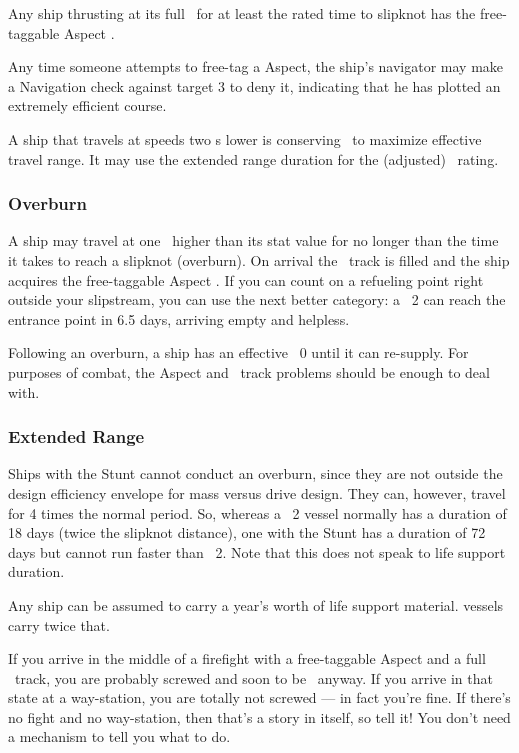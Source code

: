 Any ship thrusting at its full \Vshift\ for at least the rated time to slipknot has the free-taggable Aspect .

Any time someone attempts to free-tag a  Aspect, the ship's navigator may make a Navigation check against target 3 to deny it, indicating that he has plotted an extremely efficient course.

A ship that travels at speeds two \Vshift{}s lower is conserving \RMass\ to maximize effective travel range. It may use the extended range duration for the (adjusted) \Vshift\ rating.



\subsubsection{Overburn}

A ship may travel at one \Vshift\ higher than its stat value for no longer than the time it takes to reach a slipknot (overburn). On arrival the \Heat\ track is filled and the ship acquires the free-taggable Aspect . If you can count on a refueling point right outside your slipstream, you can use the next better category: a \Vshift\ 2 can reach the entrance point in 6.5 days, arriving empty and helpless.

Following an overburn, a ship has an effective \Vshift\ 0 until it can re-supply. For purposes of combat, the Aspect and \Heat\ track problems should be enough to deal with.

\subsubsection{Extended Range}

Ships with the  Stunt cannot conduct an overburn, since they are not outside the design efficiency envelope for mass versus drive design. They can, however, travel for 4 times the normal period. So, whereas a \Vshift\ 2 vessel normally has a duration of 18 days (twice the slipknot distance), one with the  Stunt has a duration of 72 days but cannot run faster than \Vshift\ 2. Note that this does not speak to life support duration.

Any ship can be assumed to carry a year's worth of life support material.  vessels carry twice that.

If you arrive in the middle of a firefight with a free-taggable Aspect and a full \Heat\ track, you are probably screwed and soon to be \TakenOut\ anyway. If you arrive in that state at a way-station, you are totally not screwed --- in fact you're fine. If there's no fight and no way-station, then that's a story in itself, so tell it! You don't need a mechanism to tell you what to do.

